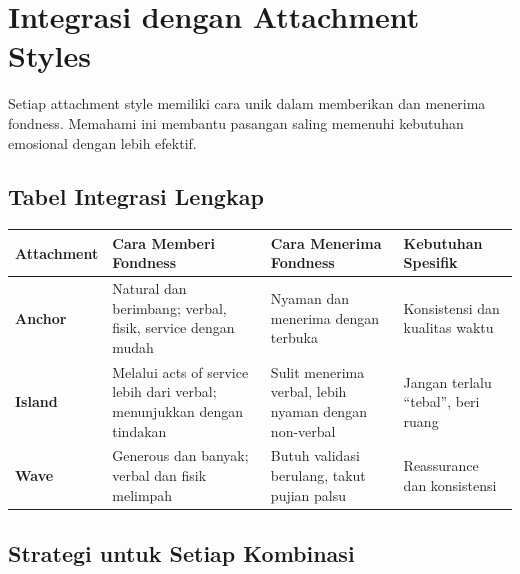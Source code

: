 \section{Integrasi dengan Attachment Styles}

\begin{insightbox}
Setiap attachment style memiliki cara unik dalam memberikan dan menerima fondness. Memahami ini membantu pasangan saling memenuhi kebutuhan emosional dengan lebih efektif.
\end{insightbox}

\subsection{Tabel Integrasi Lengkap}

\begin{center}
\renewcommand{\arraystretch}{1.6}
\begin{tabular}{|>{\raggedright}p{2.5cm}|>{\raggedright}p{4cm}|>{\raggedright}p{4cm}|>{\raggedright\arraybackslash}p{4cm}|}
\hline
\rowcolor{primary!20}
\textbf{Attachment} & \textbf{Cara Memberi Fondness} & \textbf{Cara Menerima Fondness} & \textbf{Kebutuhan Spesifik} \\
\hline
\textbf{Anchor} & Natural dan berimbang; verbal, fisik, service dengan mudah & Nyaman dan menerima dengan terbuka & Konsistensi dan kualitas waktu \\
\hline
\textbf{Island} & Melalui acts of service lebih dari verbal; menunjukkan dengan tindakan & Sulit menerima verbal, lebih nyaman dengan non-verbal & Jangan terlalu ``tebal'', beri ruang \\
\hline
\textbf{Wave} & Generous dan banyak; verbal dan fisik melimpah & Butuh validasi berulang, takut pujian palsu & Reassurance dan konsistensi \\
\hline
\end{tabular}
\end{center}

\subsection{Strategi untuk Setiap Kombinasi}

